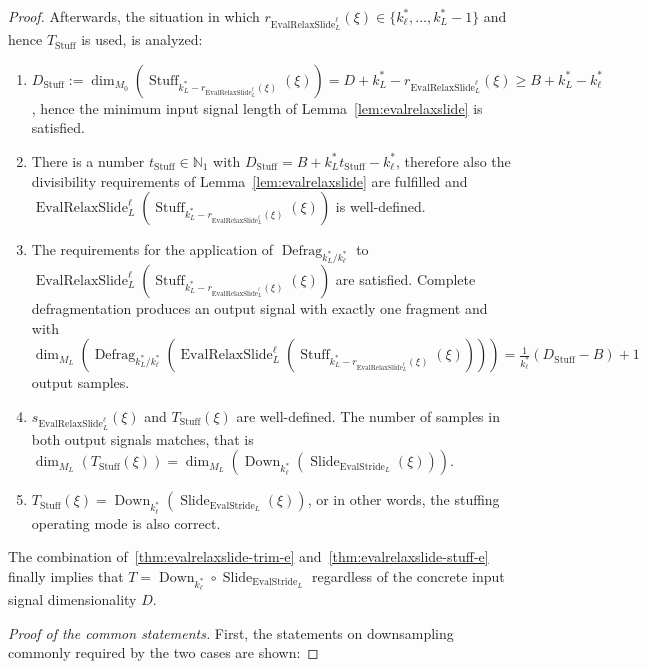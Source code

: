 \documentclass[journal]{IEEEtran}
\newcommand{\N}{\mathbb{N}}
\newcommand{\ROI}{B}
\newcommand{\discint}[2]{\{#1,\dotsc,#2\}}
\newcommand{\inint}[2]{\in\discint{#1}{#2}}
\DeclareMathOperator{\Slide}{Slide}
\DeclareMathOperator{\Defragmentation}{Defrag}
\DeclareMathOperator{\EvalStride}{EvalStride}
\DeclareMathOperator{\Stuffing}{Stuff}
\DeclareMathOperator{\EvalRelaxSlide}{EvalRelaxSlide}
\DeclareMathOperator{\Downsampling}{Down}
\begin{document}
\begin{proof}
Afterwards, the situation in which $r_{\EvalRelaxSlide_L^\ell}(\xi)\inint{k_\ell^*}{k_L^* - 1}$ and hence $T_{\Stuffing}$ is used, is analyzed:
\begin{enumerate}\setlength{\baselineskip}{1.1\baselineskip}
  \setcounter{enumi}{7}
  \item \label{thm:evalrelaxslide-stuff-a} $D_{\Stuffing} := \dim_{M_0}( \Stuffing_{k_L^* - r_{\EvalRelaxSlide_L^\ell}(\xi)}(\xi) ) = D + k_L^* - r_{\EvalRelaxSlide_L^\ell}(\xi) \geq \ROI + k_L^* - k_\ell^*$, hence the minimum input signal length of Lemma~\ref{lem:evalrelaxslide} is satisfied.
  \item \label{thm:evalrelaxslide-stuff-b} There is a number $t_{\Stuffing}\in\N_1$ with $D_{\Stuffing} = \ROI + k_L^*t_{\Stuffing} - k_\ell^*$, therefore also the divisibility requirements of Lemma~\ref{lem:evalrelaxslide} are fulfilled and $\EvalRelaxSlide_L^\ell( \Stuffing_{k_L^* - r_{\EvalRelaxSlide_L^\ell}(\xi)}(\xi) )$ is well-defined.
  \item \label{thm:evalrelaxslide-stuff-c} The requirements for the application of $\Defragmentation_{k_L^* / k_\ell^*}$ to $\EvalRelaxSlide_L^\ell( \Stuffing_{k_L^* - r_{\EvalRelaxSlide_L^\ell}(\xi)}(\xi) )$ are satisfied.
    Complete defragmentation produces an output signal with exactly one fragment and with $\dim_{M_L}( \Defragmentation_{k_L^* / k_\ell^*}( \EvalRelaxSlide_L^\ell( \Stuffing_{k_L^* - r_{\EvalRelaxSlide_L^\ell}(\xi)}(\xi) ) ) ) = \tfrac{1}{k_\ell^*}(D_{\Stuffing} - \ROI) + 1$ output samples.
  \item \label{thm:evalrelaxslide-stuff-d} $s_{\EvalRelaxSlide_L^\ell}(\xi)$ and $T_{\Stuffing}(\xi)$ are well-defined.
    The number of samples in both output signals matches, that is $\dim_{M_L}( T_{\Stuffing}(\xi) ) = \dim_{M_L}( \Downsampling_{k_\ell^*}( \Slide_{\EvalStride_L}(\xi) ) )$.
  \item \label{thm:evalrelaxslide-stuff-e} $T_{\Stuffing}(\xi) = \Downsampling_{k_\ell^*}( \Slide_{\EvalStride_L}(\xi) )$, or in other words, the stuffing operating mode is also correct.
\end{enumerate}
The combination of~\ref{thm:evalrelaxslide-trim-e} and~\ref{thm:evalrelaxslide-stuff-e} finally implies that $T = \Downsampling_{k_\ell^*}\circ \Slide_{\EvalStride_L}$ regardless of the concrete input signal dimensionality $D$.

{\parindent0mm \emph{Proof of the common statements.}}
First, the statements on downsampling commonly required by the two cases are shown:


\end{proof}
\end{document}
